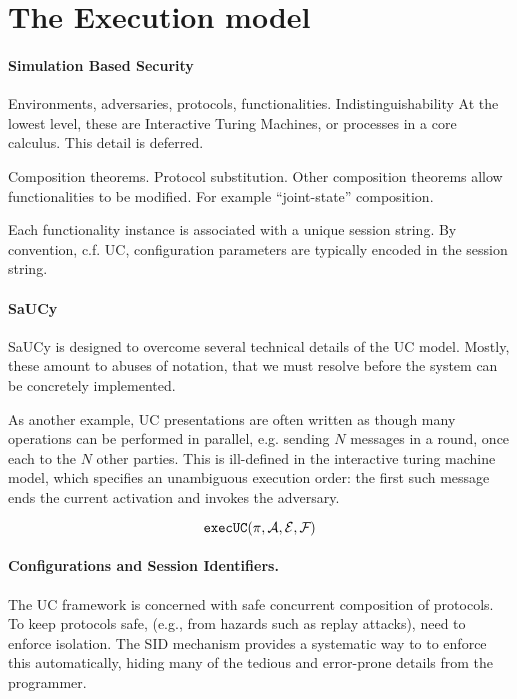 \section{The \SaUCy Execution model}

\paragraph{Simulation Based Security}
Environments, adversaries, protocols, functionalities. Indistinguishability
At the lowest level, these are Interactive Turing Machines, or processes in a core calculus. This detail is deferred.

Composition theorems. Protocol substitution. Other composition theorems allow functionalities to be modified. For example ``joint-state'' composition.

Each functionality instance is associated with a unique session string. By convention, c.f. UC, configuration parameters are typically encoded in the session string.

\paragraph{SaUCy}
SaUCy is designed to overcome several technical details of the UC model. Mostly, these amount to abuses of notation, that we must resolve before the system can be concretely implemented.

As another example, UC presentations are often written as though many operations can be performed in parallel,  e.g. sending $N$ messages in a round, once each to the $N$ other parties. This is ill-defined in the interactive turing machine model, which specifies an unambiguous execution order: the first such message ends the current activation and invokes the adversary. %

\[
 \execUC{\pi}{\A}{\Z}{\F{}}
\]


\paragraph{Configurations and Session Identifiers.}
The UC framework is concerned with safe concurrent composition of protocols. To keep protocols safe, (e.g., from hazards such as replay attacks), need to enforce isolation. The SID mechanism provides a systematic way to to enforce this automatically, hiding many of the tedious and error-prone details from the programmer.

